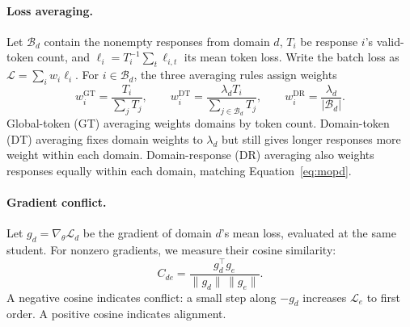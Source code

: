\paragraph{Loss averaging.}
Let $\mathcal B_d$ contain the nonempty responses from domain $d$, $T_i$ be response $i$'s valid-token count, and $\ell_i=T_i^{-1}\sum_t\ell_{i,t}$ its mean token loss. Write the batch loss as $\mathcal L=\sum_iw_i\ell_i$. For $i\in\mathcal B_d$, the three averaging rules assign weights
\begin{equation}
w_i^{\mathrm{GT}}=\frac{T_i}{\sum_jT_j},\qquad
w_i^{\mathrm{DT}}=\frac{\lambda_dT_i}{\sum_{j\in\mathcal B_d}T_j},\qquad
w_i^{\mathrm{DR}}=\frac{\lambda_d}{|\mathcal B_d|}.
\label{eq:averaging}
\end{equation}
Global-token (GT) averaging weights domains by token count. Domain-token (DT) averaging fixes domain weights to $\lambda_d$ but still gives longer responses more weight within each domain. Domain-response (DR) averaging also weights responses equally within each domain, matching Equation~\ref{eq:mopd}.

\paragraph{Gradient conflict.}
Let $g_d=\nabla_\theta\mathcal L_d$ be the gradient of domain $d$'s mean loss, evaluated at the same student. For nonzero gradients, we measure their cosine similarity:
\begin{equation}
C_{de}=\frac{g_d^\top g_e}{\|g_d\|\,\|g_e\|}.
\label{eq:gradient_conflict}
\end{equation}
A negative cosine indicates conflict: a small step along $-g_d$ increases $\mathcal L_e$ to first order. A positive cosine indicates alignment.
